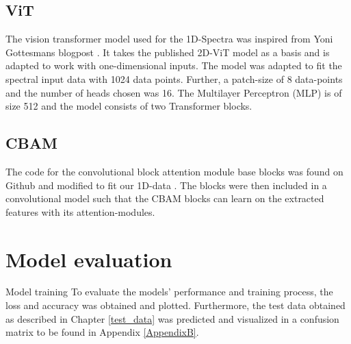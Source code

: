 

\subsection{ViT}
The vision transformer model used for the 1D-Spectra was inspired from Yoni Gottesmans blogpost \cite{noauthor_interpretable_2023}. It takes the published 2D-ViT model  as a basis and is adapted to work with one-dimensional inputs.
The model was adapted to fit the spectral input data with 1024 data points. Further, a patch-size of 8 data-points and the number of heads chosen was 16.
The Multilayer Perceptron (MLP) is of size 512 and the model consists of two Transformer blocks.




\subsection{CBAM}
The code for the convolutional block attention module base blocks was found on Github and modified to fit our 1D-data \cite{mazzia__2023}.
The blocks were then included in a convolutional model such that the CBAM blocks can learn on the extracted features with its attention-modules.



\section{Model evaluation}
Model training 
To evaluate the models' performance and training process, the loss and accuracy was obtained and plotted. Furthermore, the test data obtained as described in Chapter \ref{test_data} was predicted and visualized in a confusion matrix to be found in Appendix \ref{AppendixB}.
